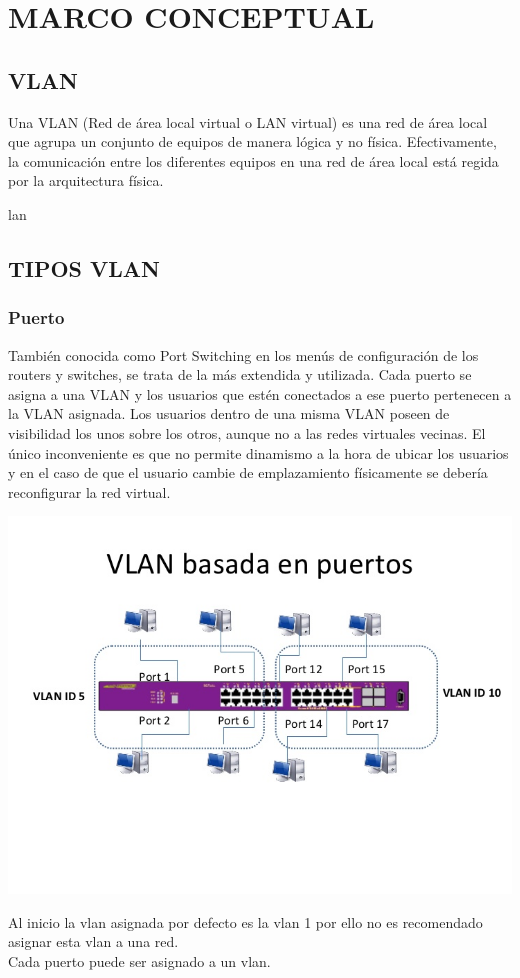   
\chapter{MARCO CONCEPTUAL}

\section{VLAN}
\begin{definicion}[]
{
Una VLAN (Red de \'area local virtual o LAN virtual) es una red de \'area local que agrupa un conjunto de equipos de manera l\'ogica y no f\'isica. Efectivamente, la comunicaci\'on entre los diferentes equipos en una red de \'area local est\'a regida por la arquitectura f\'isica.
}
\end{definicion}lan 

\section{TIPOS VLAN}
\subsection{Puerto}
\begin{definicion}[]
{
Tambi\'en conocida como Port Switching en los men\'us de configuraci\'on de los routers y switches, se trata de la m\'as extendida y utilizada. Cada puerto se asigna a una VLAN y los usuarios que est\'en conectados a ese puerto pertenecen a la VLAN asignada. Los usuarios dentro de una misma VLAN poseen de visibilidad los unos sobre los otros, aunque no a las redes virtuales vecinas. El \'unico inconveniente es que no permite dinamismo a la hora de ubicar los usuarios y en el caso de que el usuario cambie de emplazamiento f\'isicamente se deber\'ia reconfigurar la red virtual.
}
\end{definicion}

\begin{caja}[]{
\includegraphics[scale=0.5]{img/puerto.jpg} 
 }\end{caja}
 Al inicio la vlan asignada por defecto es la vlan 1 por ello no es recomendado asignar esta vlan a una red.\\
 Cada puerto puede ser asignado a un vlan.\\

